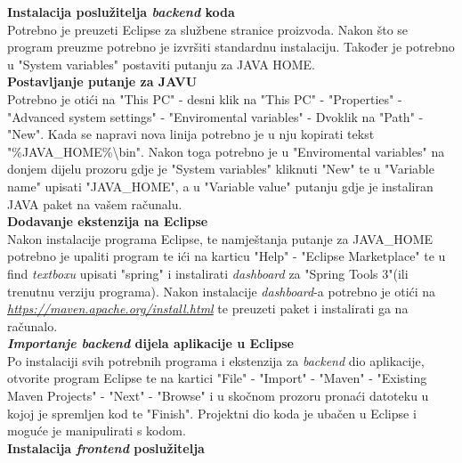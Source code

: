 			 \textbf{Instalacija poslužitelja \textit{backend} koda}\\
			 
			 {Potrebno je preuzeti Eclipse za službene stranice proizvoda. Nakon što se program preuzme potrebno je izvršiti standardnu instalaciju. Također je potrebno u "System variables" postaviti putanju za JAVA HOME.}\\
			 
			 \textbf{Postavljanje putanje za JAVU}\\
			 
			 {Potrebno je otići na "This PC" - desni klik na "This PC" - "Properties" - "Advanced system settings" - "Enviromental variables" - Dvoklik na "Path" - "New". Kada se napravi nova linija potrebno je u nju kopirati tekst "\%JAVA\_HOME\%\textbackslash bin". Nakon toga potrebno je u "Enviromental variables" na donjem dijelu prozoru gdje je "System variables" kliknuti "New" te u "Variable name" upisati "JAVA\_HOME", a u "Variable value" putanju gdje je instaliran JAVA paket na vašem računalu.}\\
			 
			 \textbf{Dodavanje ekstenzija na Eclipse}\\
			 
			 {Nakon instalacije programa Eclipse, te namještanja putanje za JAVA\_HOME potrebno je upaliti program te ići na karticu "Help" - "Eclipse Marketplace" te u find \textit{textboxu} upisati "spring" i instalirati \textit{dashboard} za "Spring Tools 3"(ili trenutnu verziju programa). Nakon instalacije \textit{dashboard}-a potrebno je otići na \textit{\href{https://maven.apache.org/install.html}{https://maven.apache.org/install.html}} te preuzeti paket i instalirati ga na računalo.}\\
			 
			 \textbf{\textit{Importanje backend} dijela aplikacije u Eclipse}\\
			 
			 {Po instalaciji svih potrebnih programa i ekstenzija za \textit{backend} dio aplikacije, otvorite program Eclipse te na kartici "File" - "Import" - "Maven" - "Existing Maven Projects" - "Next" - "Browse" i u skočnom prozoru pronaći datoteku u kojoj je spremljen kod te "Finish". Projektni dio koda je ubačen u Eclipse i moguće je manipulirati s kodom.}\\
			 
			 \textbf{Instalacija \textit{frontend} poslužitelja}\\
			 
